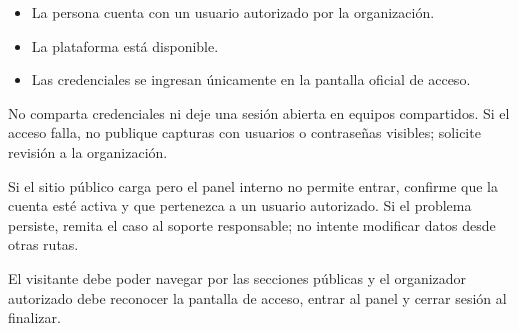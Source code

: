 \begin{precondiciones}
\begin{itemize}
    \item La persona cuenta con un usuario autorizado por la organización.
    \item La plataforma está disponible.
    \item Las credenciales se ingresan únicamente en la pantalla oficial de acceso.
\end{itemize}
\end{precondiciones}



\begin{advertencia}
No comparta credenciales ni deje una sesión abierta en equipos compartidos. Si el acceso falla, no publique capturas con usuarios o contraseñas visibles; solicite revisión a la organización.
\end{advertencia}

\begin{fallas}
Si el sitio público carga pero el panel interno no permite entrar, confirme que la cuenta esté activa y que pertenezca a un usuario autorizado. Si el problema persiste, remita el caso al soporte responsable; no intente modificar datos desde otras rutas.
\end{fallas}

\begin{resultadoesperado}
El visitante debe poder navegar por las secciones públicas y el organizador autorizado debe reconocer la pantalla de acceso, entrar al panel y cerrar sesión al finalizar.
\end{resultadoesperado}
